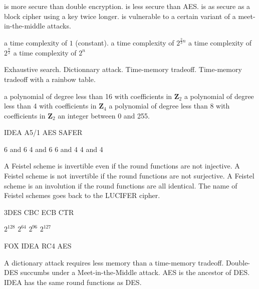{is more secure than double encryption.}
{is less secure than AES.}
{is as secure as a block cipher using a key twice longer.}
{is vulnerable to a certain variant of a meet-in-the-middle attacks.}

{a time complexity of $1$ (constant).}
{a time complexity of $2^{\frac{2}{3}n}$}
{a time complexity of $2^{\frac{n}{2}}$}
{a time complexity of $2^{n}$}

{Exhaustive search.}
{Dictionnary attack.}
{Time-memory tradeoff.}
{Time-memory tradeoff with a rainbow table.}

{a polynomial of degree less than 16 with coefficients in $\mathbf{Z}_2$}
{a polynomial of degree less than  4 with coefficients in $\mathbf{Z}_4$}
{a polynomial of degree less than  8 with coefficients in $\mathbf{Z}_2$}
{an integer between 0 and 255.}

{IDEA}
{A5/1}
{AES}
{SAFER}


{6 and 6}
{4 and 6}
{6 and 4}
{4 and 4}

{A Feistel scheme is invertible even if the round functions are not injective.}
{A Feistel scheme is not invertible if the round functions are not surjective.}
{A Feistel scheme is an involution if the round functions are all identical.}
{The name of Feistel schemes goes back to the LUCIFER cipher.}

{3DES} 
{CBC}
{ECB} 
{CTR}

{$2^{128}$}
{$2^{64}$}
{$2^{96}$}
{$2^{127}$}

{FOX}
{IDEA}
{RC4}
{AES}

{A dictionary attack requires less memory than a time-memory tradeoff.}
{Double-DES succumbs under a Meet-in-the-Middle attack.}
{AES is the ancestor of DES.}
{IDEA has the same round functions as DES.}
  
